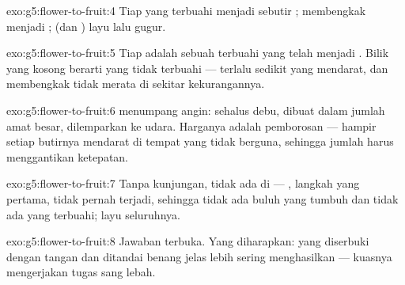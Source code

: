 \begin{solution}{exo:g5:flower-to-fruit:4}
Tiap  yang terbuahi menjadi sebutir ; 
membengkak menjadi ;  (dan ) layu
lalu gugur.
\end{solution}

\begin{solution}{exo:g5:flower-to-fruit:5}
Tiap  adalah sebuah  terbuahi yang telah menjadi
. Bilik yang kosong berarti  yang tidak terbuahi ---
terlalu sedikit  yang mendarat, dan  membengkak
tidak merata di sekitar kekurangannya.
\end{solution}

\begin{solution}{exo:g5:flower-to-fruit:6}
 menumpang angin: sehalus debu, dibuat dalam jumlah amat
besar, dilemparkan ke udara. Harganya adalah pemborosan --- hampir
setiap butirnya mendarat di tempat yang tidak berguna, sehingga jumlah
harus menggantikan ketepatan.
\end{solution}

\begin{solution}{exo:g5:flower-to-fruit:7}
Tanpa kunjungan, tidak ada  di  --- ,
langkah yang pertama, tidak pernah terjadi, sehingga tidak ada buluh
yang tumbuh dan tidak ada  yang terbuahi;  layu
seluruhnya.
\end{solution}

\begin{solution}{exo:g5:flower-to-fruit:8}
Jawaban terbuka. Yang diharapkan:  yang diserbuki dengan tangan
dan ditandai benang jelas lebih sering menghasilkan  --- kuasnya
mengerjakan tugas sang lebah.
\end{solution}

